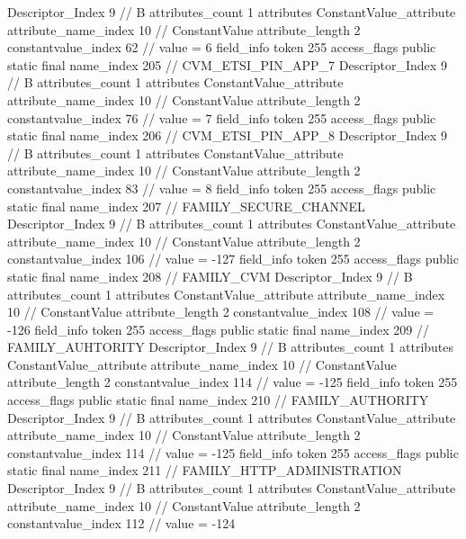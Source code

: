 {{{{{				Descriptor_Index	9		// B
				attributes_count	1
				attributes {
				ConstantValue_attribute {
					attribute_name_index	10		// ConstantValue
					attribute_length	2
					constantvalue_index	62		// value = 6
				}
				}
			}
			field_info {
				token	255
				access_flags	public static final
				name_index	205		// CVM_ETSI_PIN_APP_7
				Descriptor_Index	9		// B
				attributes_count	1
				attributes {
				ConstantValue_attribute {
					attribute_name_index	10		// ConstantValue
					attribute_length	2
					constantvalue_index	76		// value = 7
				}
				}
			}
			field_info {
				token	255
				access_flags	public static final
				name_index	206		// CVM_ETSI_PIN_APP_8
				Descriptor_Index	9		// B
				attributes_count	1
				attributes {
				ConstantValue_attribute {
					attribute_name_index	10		// ConstantValue
					attribute_length	2
					constantvalue_index	83		// value = 8
				}
				}
			}
			field_info {
				token	255
				access_flags	public static final
				name_index	207		// FAMILY_SECURE_CHANNEL
				Descriptor_Index	9		// B
				attributes_count	1
				attributes {
				ConstantValue_attribute {
					attribute_name_index	10		// ConstantValue
					attribute_length	2
					constantvalue_index	106		// value = -127
				}
				}
			}
			field_info {
				token	255
				access_flags	public static final
				name_index	208		// FAMILY_CVM
				Descriptor_Index	9		// B
				attributes_count	1
				attributes {
				ConstantValue_attribute {
					attribute_name_index	10		// ConstantValue
					attribute_length	2
					constantvalue_index	108		// value = -126
				}
				}
			}
			field_info {
				token	255
				access_flags	public static final
				name_index	209		// FAMILY_AUHTORITY
				Descriptor_Index	9		// B
				attributes_count	1
				attributes {
				ConstantValue_attribute {
					attribute_name_index	10		// ConstantValue
					attribute_length	2
					constantvalue_index	114		// value = -125
				}
				}
			}
			field_info {
				token	255
				access_flags	public static final
				name_index	210		// FAMILY_AUTHORITY
				Descriptor_Index	9		// B
				attributes_count	1
				attributes {
				ConstantValue_attribute {
					attribute_name_index	10		// ConstantValue
					attribute_length	2
					constantvalue_index	114		// value = -125
				}
				}
			}
			field_info {
				token	255
				access_flags	public static final
				name_index	211		// FAMILY_HTTP_ADMINISTRATION
				Descriptor_Index	9		// B
				attributes_count	1
				attributes {
				ConstantValue_attribute {
					attribute_name_index	10		// ConstantValue
					attribute_length	2
					constantvalue_index	112		// value = -124
				}
}}}}}}

